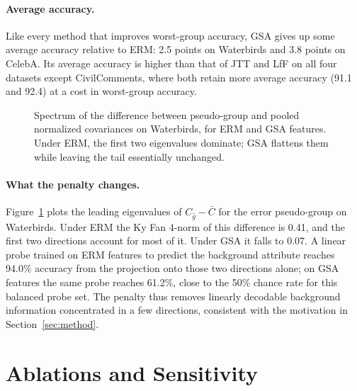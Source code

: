 \documentclass{article}
\begin{document}
\paragraph{Average accuracy.}
Like every method that improves worst-group accuracy, GSA gives up some average accuracy relative to ERM: 2.5 points on Waterbirds and 3.8 points on CelebA. Its average accuracy is higher than that of JTT and LfF on all four datasets except CivilComments, where both retain more average accuracy (91.1 and 92.4) at a cost in worst-group accuracy.

\begin{figure}[t]
\centering
{}
\caption{Spectrum of the difference between pseudo-group and pooled normalized covariances on Waterbirds, for ERM and GSA features. Under ERM, the first two eigenvalues dominate; GSA flattens them while leaving the tail essentially unchanged.}
\label{fig:spectrum}
\end{figure}

\paragraph{What the penalty changes.}
Figure~\ref{fig:spectrum} plots the leading eigenvalues of $C_{\hat g} - \bar C$ for the error pseudo-group on Waterbirds. Under ERM the Ky Fan 4-norm of this difference is 0.41, and the first two directions account for most of it. Under GSA it falls to 0.07. A linear probe trained on ERM features to predict the background attribute reaches 94.0\% accuracy from the projection onto those two directions alone; on GSA features the same probe reaches 61.2\%, close to the 50\% chance rate for this balanced probe set. The penalty thus removes linearly decodable background information concentrated in a few directions, consistent with the motivation in Section~\ref{sec:method}.

\section{Ablations and Sensitivity}
\label{sec:ablation}
\end{document}
